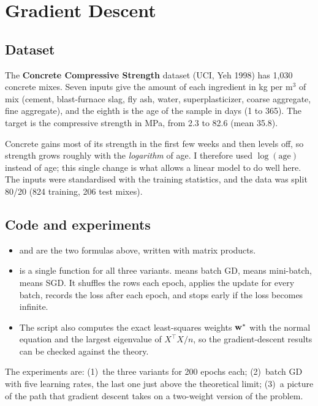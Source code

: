 \chapter{Gradient Descent}


\section{Dataset}
The \textbf{Concrete Compressive Strength} dataset (UCI, Yeh 1998) has 1,030 concrete mixes. Seven
inputs give the amount of each ingredient in kg per m$^3$ of mix (cement, blast-furnace slag, fly ash,
water, superplasticizer, coarse aggregate, fine aggregate), and the eighth is the age of the sample in
days (1 to 365). The target is the compressive strength in MPa, from 2.3 to 82.6 (mean 35.8).

Concrete gains most of its strength in the first few weeks and then levels off, so strength grows
roughly with the \emph{logarithm} of age. I therefore used $\log(\text{age})$ instead of age; this
single change is what allows a linear model to do well here. The inputs were standardised with the
training statistics, and the data was split 80/20 (824 training, 206 test mixes).

\section{Code and experiments}
\begin{itemize}
\item {} and  are the two formulas above, written with matrix products.
\item {} is a single function for all three
      variants.  means batch GD,  means mini-batch,  means SGD.
      It shuffles the rows each epoch, applies the update for every batch, records the loss after
      each epoch, and stops early if the loss becomes infinite.
\item The script also computes the exact least-squares weights $\mathbf{w}^*$ with the normal equation and
      the largest eigenvalue of $X^\top X/n$, so the gradient-descent results can be checked against
      the theory.
\end{itemize}
\noindent The experiments are: (1)~the three variants for 200 epochs each; (2)~batch GD with five
learning rates, the last one just above the theoretical limit; (3)~a picture of the path that gradient
descent takes on a two-weight version of the problem.


